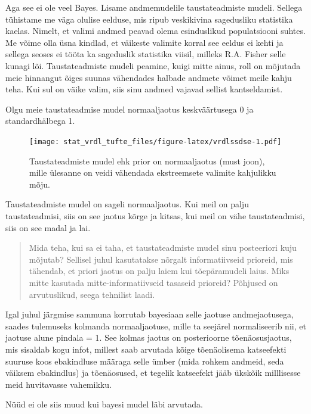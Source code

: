 \documentclass[]{book}
\begin{document}
Aga see ei ole veel Bayes.
Lisame andmemudelile taustateadmiste mudeli.
Sellega tühistame me väga olulise eelduse, mis ripub veskikivina sagedusliku statistika kaelas.
Nimelt, et valimi andmed peavad olema esinduslikud populatsiooni suhtes.
Me võime olla üsna kindlad, et väikeste valimite korral see eeldus ei kehti ja sellega seoses ei tööta ka sageduslik statistika viisil, milleks R.A. Fisher selle kunagi lõi.
Taustateadmiste mudeli peamine, kuigi mitte ainus, roll on mõjutada meie hinnangut õiges suunas vähendades halbade andmete võimet meile kahju teha.
Kui sul on väike valim, siis sinu andmed vajavad sellist kantseldamist.

Olgu meie taustateadmise mudel normaaljaotus keskväärtusega 0 ja standardhälbega 1.

\begin{figure}
\centering
\texttt{[image: stat\_vrdl\_tufte\_files/figure-latex/vrdlssdse-1.pdf]}
\caption{\label{fig:vrdlssdse}Taustateadmiste mudel ehk prior on normaaljaotus (must joon), mille ülesanne on veidi vähendada ekstreemsete valimite kahjulikku mõju.}
\end{figure}

Taustateadmiste mudel on sageli normaaljaotus.
Kui meil on palju taustateadmisi, siis on see jaotus kõrge ja kitsas, kui meil on vähe taustateadmisi, siis on see madal ja lai.

\begin{quote}
Mida teha, kui sa ei taha, et taustateadmiste mudel sinu posteeriori kuju mõjutab? Sellisel juhul kasutatakse nõrgalt informatiivseid prioreid, mis tähendab, et priori jaotus on palju laiem kui tõepäramudeli laius. Miks mitte kasutada mitte-informatiivseid tasaseid prioreid? Põhjused on arvutuslikud, seega tehnilist laadi.
\end{quote}

Igal juhul järgmise sammuna korrutab bayesiaan selle jaotuse andmejaotusega, saades tulemuseks kolmanda normaaljaotuse, mille ta seejärel normaliseerib nii, et jaotuse alune pindala = 1.
See kolmas jaotus on posterioorne tõenäosusjaotus, mis sisaldab kogu infot, millest saab arvutada kõige tõenäolisema katseefekti suuruse koos ebakindluse määraga selle ümber (mida rohkem andmeid, seda väiksem ebakindlus) ja tõenäosused, et tegelik katseefekt jääb ükskõik milllisesse meid huvitavasse vahemikku.

Nüüd ei ole siis muud kui bayesi mudel läbi arvutada.
\end{document}
